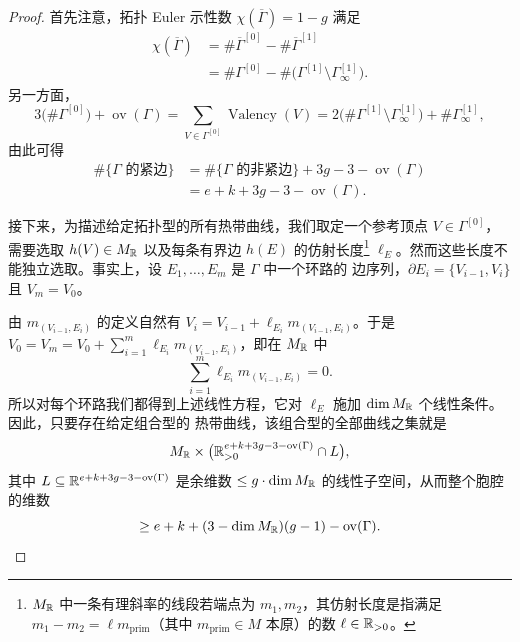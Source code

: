 \begin{proof}
首先注意，拓扑 Euler 示性数 $\chi(\overline{\Gamma}) = 1 - g$ 满足
\begin{align*}
\chi(\overline{\Gamma}) &= \#\overline{\Gamma}^{[0]} - \#\overline{\Gamma}^{[1]} \\
&= \#\Gamma^{[0]} - \#\bigl(\Gamma^{[1]} \setminus \Gamma^{[1]}_\infty\bigr).
\end{align*}
另一方面，
\[
3\bigl(\#\Gamma^{[0]}\bigr) + \operatorname{ov}(\Gamma)
= \sum_{V\in\Gamma^{[0]}} \operatorname{Valency}(V)
= 2\bigl(\#\Gamma^{[1]} \setminus \Gamma^{[1]}_\infty\bigr) + \#\Gamma^{[1]}_\infty,
\]
由此可得
\begin{align*}
\#\{\Gamma \text{ 的紧边}\} &= \#\{\Gamma \text{ 的非紧边}\} + 3g - 3 - \operatorname{ov}(\Gamma) \\
&= e + k + 3g - 3 - \operatorname{ov}(\Gamma).
\end{align*}

接下来，为描述给定拓扑型的所有热带曲线，我们取定一个参考顶点 $V \in \Gamma^{[0]}$，需要选取
$h(V) \in M_{\mathbb{R}}$ 以及每条有界边 $h(E)$ 的仿射长度\footnote{$M_{\mathbb{R}}$ 中一条有理斜率的线段若端点为
$m_1, m_2$，其仿射长度是指满足 $m_1 - m_2 = \ell m_{\mathrm{prim}}$（其中 $m_{\mathrm{prim}} \in M$ 本原）的数
$\ell \in \mathbb{R}_{>0}$。} $\ell_E$。然而这些长度不能独立选取。事实上，设 $E_1,\dots,E_m$ 是 $\Gamma$ 中一个环路的
边序列，$\partial E_i = \{V_{i-1}, V_i\}$ 且 $V_m = V_0$。

由 $m_{(V_{i-1},E_i)}$ 的定义自然有 $V_i = V_{i-1} + \ell_{E_i} m_{(V_{i-1},E_i)}$。于是
$V_0 = V_m = V_0 + \sum_{i=1}^m \ell_{E_i} m_{(V_{i-1},E_i)}$，即在 $M_{\mathbb{R}}$ 中
\[
\sum_{i=1}^m \ell_{E_i} m_{(V_{i-1},E_i)} = 0.
\]
所以对每个环路我们都得到上述线性方程，它对 $\ell_E$ 施加 $\dim M_{\mathbb{R}}$ 个线性条件。因此，只要存在给定组合型的
热带曲线，该组合型的全部曲线之集就是
\[
M_{\mathbb{R}} \times \bigl(\mathbb{R}^{e+k+3g-3-\operatorname{ov}(\Gamma)}_{>0} \cap L\bigr),
\]
其中 $L \subseteq \mathbb{R}^{e+k+3g-3-\operatorname{ov}(\Gamma)}$ 是余维数 $\le g\cdot\dim M_{\mathbb{R}}$ 的线性子空间，从而整个胞腔的维数
\[
\ge e+k+(3-\dim M_{\mathbb{R}})(g-1) - \operatorname{ov}(\Gamma). \qedhere
\]
\end{proof}


